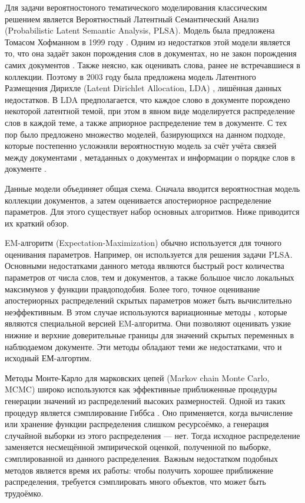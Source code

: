 \documentclass[12pt]{article}
\begin{document}
Для  задачи вероятностоного тематического моделирования  классическим решением является Вероятностный Латентный Семантический Анализ (Probabilistic Latent Semantic Analysis, PLSA). Модель  была предложена Томасом Хофманном в 1999 году \cite{hofmann1999probabilistic}. Одним из недостатков этой модели является то, что она задаёт закон порождения слов в документах, но не закон порождения самих документов \cite{daud2010knowledge}. Также  неясно, как оценивать слова, ранее не встречавшиеся в коллекции. Поэтому в 2003 году была предложена модель Латентного Размещения Дирихле (Latent Dirichlet Allocation, LDA) \cite{blei2003latent}, лишённая данных недостатков. В LDA предполагается, что каждое слово в документе порождено некоторой латентной темой, при этом в явном виде моделируется распределение слов в каждой теме, а также априорное
распределение тем в документе. С тех пор было предложено множество моделей, базирующихся на данном подходе, которые постепенно усложняли вероятностную модель за счёт учёта связей между документами \cite{cohn2001missing, mccallum2005author, nallapati2008link}, метаданных о документах \cite{steyvers2004probabilistic} и информации о порядке слов в документе \cite{gruber2007hidden, wallach2006topic}.

Данные модели объединяет общая схема. Сначала вводится вероятностная модель коллекции документов, а затем оценивается  апостериорное распределение  параметров. Для этого существует набор основных алгоритмов. Ниже приводится их краткий обзор.

EM-алгоритм (Expectation-Maximization) \cite{bilmes1998gentle} обычно используется для  точного оценивания параметров. Например, он используется для решения задачи PLSA. Основными недостатками данного метода являются быстрый рост количества параметров от числа слов, тем и документов, а также большое число локальных максимумов у функции правдоподобия. Более того, точное оценивание апостериорных распределений скрытых параметров может быть вычислительно неэффективным. В этом случае используются вариационные методы \cite{jordan1999introduction}, которые являются специальной версией EM-алгоритма. Они  позволяют оценивать узкие нижние и верхние доверительные границы для значений скрытых переменных в наблюдаемом документе. Эти методы обладают теми же недостатками, что и исходный ЕМ-алгортим.

Методы Монте-Карло для марковских цепей (Markov chain Monte Carlo, MCMC) \cite{gilks1996introducing, andrieu2003introduction} широко используются как эффективные приближенные процедуры генерации значений из распределений высоких размерностей. Одной из таких процедур является сэмплирование Гиббса \cite{griffiths2004finding}.  Оно применяется, когда вычисление или хранение функции распределения слишком ресурсоёмко, а генерация случайной выборки из этого распределения --- нет. Тогда исходное распределение заменяется несмещённой эмпирической оценкой, полученной по выборке, сэмплированной из данного распределения. Важным недостатком подобных методов является время их работы: чтобы получить хорошее приближение распределения, требуется сэмплировать много объектов, что может быть трудоёмко. 
\end{document}
